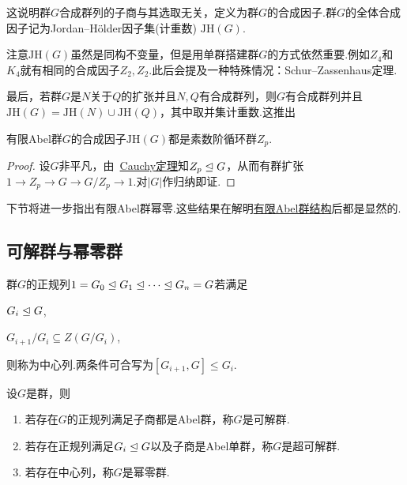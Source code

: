 这说明群$G$合成群列的子商与其选取无关，定义为群$G$的{\heiti 合成因子}.群$G$的全体合成因子记为Jordan--H\"older因子集(计重数) $\mathrm{JH}(G)$.
\begin{remark}
	注意$\mathrm{JH}(G)$虽然是同构不变量，但是用单群搭建群$G$的方式依然重要.例如$Z_4$和$K_4$就有相同的合成因子$Z_2,Z_2$.此后会提及一种特殊情况：Schur--Zassenhaus定理.
\end{remark}

最后，若群$G$是$N$关于$Q$的扩张并且$N,Q$有合成群列，则$G$有合成群列并且$\mathrm{JH}(G)=\mathrm{JH}(N)\cup\mathrm{JH}(Q)$，其中取并集计重数.这推出
\begin{prop}
	有限Abel群$G$的合成因子$\mathrm{JH}(G)$都是素数阶循环群$Z_p$.
\end{prop}
\begin{proof}
	设$G$非平凡，由~\hyperlink{thm:Cauchy}{Cauchy定理}知$Z_p\trianglelefteq G$，从而有群扩张$1\to Z_p\to G\to G/Z_p\to 1$.对$|G|$作归纳即证.
\end{proof}
\begin{remark}
	下节将进一步指出有限Abel群幂零.这些结果在解明\hyperlink{thm:FiniteAbelStruc}{有限Abel群结构}后都是显然的.
\end{remark}
\subsection{可解群与幂零群}
\begin{definition}
	群$G$的正规列$1=G_0\trianglelefteq G_1\trianglelefteq\cdots\trianglelefteq G_n=G$若满足
	
	\begin{enumerate*}
		\item $G_i\trianglelefteq G$,\phantom{\qquad}
		\item $G_{i+1}/G_i\subseteq Z(G/G_i)$,
	\end{enumerate*}
	
	则称为{\heiti 中心列}.两条件可合写为$[G_{i+1},G]\le G_i$.
\end{definition}
\begin{definition}
	设$G$是群，则
	\begin{enumerate}
		\item 若存在$G$的正规列满足子商都是Abel群，称$G$是{\heiti 可解群}.
		\item 若存在正规列满足$G_i\trianglelefteq G$以及子商是Abel单群，称$G$是{\heiti 超可解群}.
		\item 若存在中心列，称$G$是{\heiti 幂零群}.
	\end{enumerate}
\end{definition}

